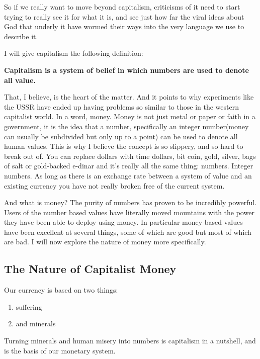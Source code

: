 So if we really want to move beyond capitalism, criticisms of it need to
start trying to really see it for what it is, and see just how far the
viral ideas about God that underly it have wormed their ways into the
very language we use to describe it.

I will give capitalism the following definition:

\textbf{Capitalism is a system of belief in which numbers are used to
denote all value.}

That, I believe, is the heart of the matter. And it points to why
experiments like the USSR have ended up having problems so similar to
those in the western capitalist world. In a word, money. Money is not
just metal or paper or faith in a government, it is the idea that a
number, specifically an integer number(money can usually be subdivided
but only up to a point) can be used to denote all human values. This is
why I believe the concept is so slippery, and so hard to break out of.
You can replace dollars with time dollars, bit coin, gold, silver, bags
of salt or gold-backed e-dinar and it's really all the same thing:
numbers. Integer numbers. As long as there is an exchange rate between a
system of value and an existing currency you have not really broken free
of the current system.

And what is money? The purity of numbers has proven to be incredibly
powerful. Users of the number based values have literally moved
mountains with the power they have been able to deploy using money. In
particular money based values have been excellent at several things,
some of which are good but most of which are bad. I will now explore the
nature of money more specifically.

\subsection{The Nature of Capitalist
Money}\label{the-nature-of-capitalist-money}

Our currency is based on two things:

\begin{enumerate}
\def\labelenumi{\arabic{enumi}.}
\item
  suffering
\item
  and minerals
\end{enumerate}

Turning minerals and human misery into numbers is capitalism in a
nutshell, and is the basis of our monetary system.

